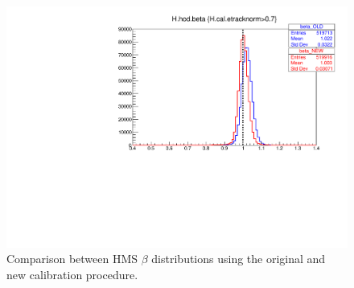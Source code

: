 \documentclass[14pt]{article}
\begin{document}
\begin{figure}[H]
    \captionsetup{justification=raggedright,singlelinecheck=false}
    \includegraphics[scale=0.7]{hms_betaCompare.pdf}
    \caption{Comparison between HMS $\beta$ distributions using the original and new calibration procedure.}
    \label{fig:beta}
\end{figure}


 
\end{document}
